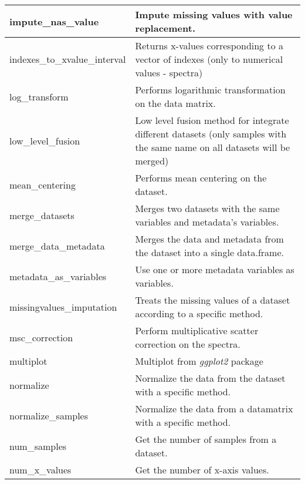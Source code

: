 \begin{scriptsize}
\begin{longtable}{|m{4.3cm}|m{11cm}|}
		\hline
		impute\_nas\_value & Impute missing values with value replacement. \\
		
		\hline
		indexes\_to\_xvalue\_interval & Returns x-values corresponding to a vector of indexes (only to numerical values - spectra) \\
		
		\hline
		log\_transform & Performs logarithmic transformation on the data matrix. \\
		
		\hline
		low\_level\_fusion & Low level fusion method for integrate different datasets (only samples with the same name on all
		datasets will be merged) \\
		
		\hline
		mean\_centering & Performs mean centering on the dataset. \\
		
		\hline
		merge\_datasets & Merges two datasets with the same variables and metadata’s variables. \\
		
		\hline
		merge\_data\_metadata & Merges the data and metadata from the dataset into a single data.frame. \\
		
		\hline
		metadata\_as\_variables & Use one or more metadata variables as variables. \\
		
		\hline
		missingvalues\_imputation & Treats the missing values of a dataset according to a specific method. \\
		
		\hline
		msc\_correction & Perform multiplicative scatter correction on the spectra. \\
		
		\hline
		multiplot & Multiplot from \textit{ggplot2} package \\
		
		\hline
		normalize & Normalize the data from the dataset with a specific method. \\
		
		\hline
		normalize\_samples & Normalize the data from a datamatrix with a specific method. \\
		
		\hline
		num\_samples & Get the number of samples from a dataset. \\
		
		\hline
		num\_x\_values & Get the number of x-axis values. \\
		

\end{longtable}
\end{scriptsize}
